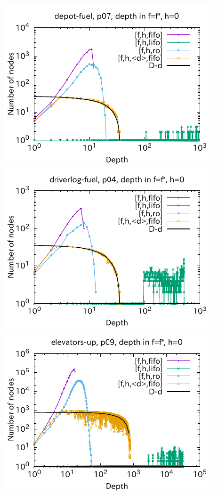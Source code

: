 \begin{figure}[htbp]
\includegraphics{img/output-lmcut/depot-fuel/p07.pdf}
\includegraphics{img/output-lmcut/driverlog-fuel/p04.pdf}
\includegraphics{img/output-lmcut/elevators-up/p09.pdf}

\end{figure}
